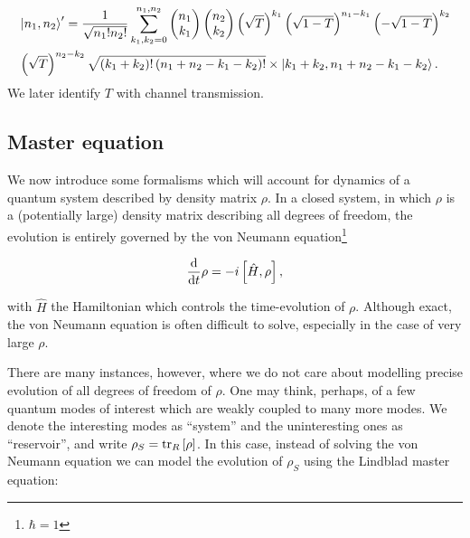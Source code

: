 \begin{align}\label{eqn:intro_beamsplitter_fock}
&\ket{n_1, n_2}^\prime  = \frac{1}{\sqrt{n_1! n_2!}} \sum_{k_1, k_2=0}^{n_1, n_2} \pmqty{n_1 \\ k_1} \pmqty{n_2 \\ k_2} \left(\sqrt{T}\right)^{k_1} \left(\sqrt{1-T}\right)^{n_1 - k_1} \left(-\sqrt{1-T}\right)^{k_2} \notag \\
%
&\left(\sqrt{T}\right)^{n_2 - k_2} \sqrt{\left(k_1 + k_2\right)! \left(n_1 + n_2 - k_1 - k_2\right)!} \times \ket{k_1 + k_2, n_1 + n_2 - k_1 - k_2}.
\end{align}
We later identify $T$ with channel transmission.



\FloatBarrier
\subsection{Master equation}

We now introduce some formalisms which will account for dynamics of a quantum system described by density matrix $\rho$. In a closed system, in which $\rho$ is a (potentially large) density matrix describing all degrees of freedom, the evolution is entirely governed by the von Neumann equation\footnote{$\hbar = 1$}

\begin{equation}
\frac{\mathrm{d}}{\mathrm{d}t} \rho = - i \left[\hat{H}, \rho \right],
\end{equation}

\noindent with $\hat{H}$ the Hamiltonian which controls the time-evolution of $\rho$. Although exact, the von Neumann equation is often difficult to solve, especially in the case of very large $\rho$.

There are many instances, however, where we do not care about modelling precise evolution of all degrees of freedom of $\rho$. One may think, perhaps, of a few quantum modes of interest which are weakly coupled to many more modes. We denote the interesting modes as ``system'' and the uninteresting ones as ``reservoir'', and write $\rho_S = \tr_R\left[\rho\right]$. In this case, instead of solving the von Neumann equation we can model the evolution of $\rho_S$ using the Lindblad master equation:

